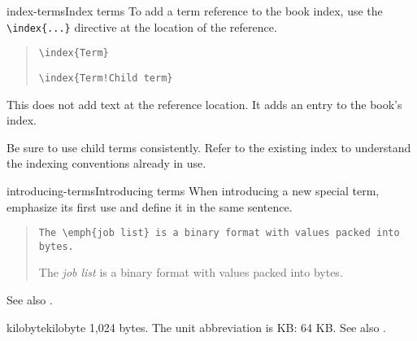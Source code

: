 \begin{sgentry}{index-terms}{Index terms}
    To add a term reference to the book index, use the \texttt{{\textbackslash}index\{...\}} directive at the location of the reference.

    \begin{quote}
        \texttt{{\textbackslash}index\{Term\}}

        \hrulefill

        \texttt{{\textbackslash}index\{Term!Child term\}}
    \end{quote}

    This does not add text at the reference location. It adds an entry to the book's index.

    Be sure to use child terms consistently. Refer to the existing index to understand the indexing conventions already in use.
\end{sgentry}

\begin{sgentry}{introducing-terms}{Introducing terms}
    When introducing a new special term, emphasize its first use and define it in the same sentence.

    \begin{quote}
        \texttt{The {\textbackslash}emph\{job list\} is a binary format with values packed into bytes.}

        \hrulefill

        The \emph{job list} is a binary format with values packed into bytes.
    \end{quote}

    See also .
\end{sgentry}

\begin{sgentry}{kilobyte}{kilobyte}
    1,024 bytes. The unit abbreviation is KB: 64 KB. See also .
\end{sgentry}

